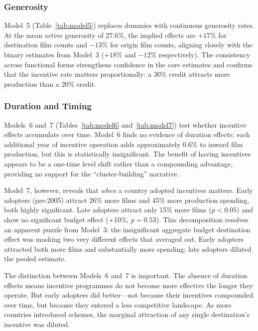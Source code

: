 \subsubsection{Generosity}

Model~5 (Table~\ref{tab:model5}) replaces dummies with continuous generosity rates. At the mean active generosity of 27.6\%, the implied effects are $+17\%$ for destination film counts and $-13\%$ for origin film counts, aligning closely with the binary estimates from Model~3 ($+18\%$ and $-12\%$ respectively). The consistency across functional forms strengthens confidence in the core estimates and confirms that the incentive rate matters proportionally: a 30\% credit attracts more production than a 20\% credit.

\subsubsection{Duration and Timing}

Models~6 and~7 (Tables~\ref{tab:model6} and~\ref{tab:model7}) test whether incentive effects accumulate over time. Model~6 finds no evidence of duration effects: each additional year of incentive operation adds approximately 0.6\% to inward film production, but this is statistically insignificant. The benefit of having incentives appears to be a one-time level shift rather than a compounding advantage, providing no support for the ``cluster-building'' narrative.

Model~7, however, reveals that \textit{when} a country adopted incentives matters. Early adopters (pre-2005) attract 26\% more films and 45\% more production spending, both highly significant. Late adopters attract only 15\% more films ($p < 0.05$) and show no significant budget effect (+10\%, $p = 0.53$). This decomposition resolves an apparent puzzle from Model~3: the insignificant aggregate budget destination effect was masking two very different effects that averaged out. Early adopters attracted both more films and substantially more spending; late adopters diluted the pooled estimate.

The distinction between Models~6 and~7 is important. The absence of duration effects means incentive programmes do not become more effective the longer they operate. But early adopters did better---not because their incentives compounded over time, but because they entered a less competitive landscape. As more countries introduced schemes, the marginal attraction of any single destination's incentive was diluted.

